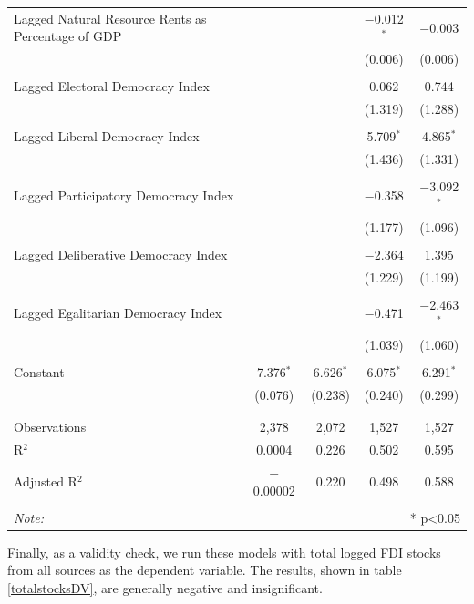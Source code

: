 \documentclass[11pt, titlepage]{article} %
\begin{document}
\begin{table}[!htbp]
\begin{tabular}{@{\extracolsep{5pt}}lcccc}
 Lagged Natural Resource Rents as Percentage of GDP &  &  & $-$0.012$^{*}$ & $-$0.003 \\ 
  &  &  & (0.006) & (0.006) \\ 
  & & & & \\ 
 Lagged Electoral Democracy Index &  &  & 0.062 & 0.744 \\ 
  &  &  & (1.319) & (1.288) \\ 
  & & & & \\ 
 Lagged Liberal Democracy Index &  &  & 5.709$^{*}$ & 4.865$^{*}$ \\ 
  &  &  & (1.436) & (1.331) \\ 
  & & & & \\ 
 Lagged Participatory Democracy Index &  &  & $-$0.358 & $-$3.092$^{*}$ \\ 
  &  &  & (1.177) & (1.096) \\ 
  & & & & \\ 
 Lagged Deliberative Democracy Index &  &  & $-$2.364 & 1.395 \\ 
  &  &  & (1.229) & (1.199) \\ 
  & & & & \\ 
 Lagged Egalitarian Democracy Index &  &  & $-$0.471 & $-$2.463$^{*}$ \\ 
  &  &  & (1.039) & (1.060) \\ 
  & & & & \\ 
 Constant & 7.376$^{*}$ & 6.626$^{*}$ & 6.075$^{*}$ & 6.291$^{*}$ \\ 
  & (0.076) & (0.238) & (0.240) & (0.299) \\ 
  & & & & \\ 
\hline \\[-1.8ex] 
Observations & 2,378 & 2,072 & 1,527 & 1,527 \\ 
R$^{2}$ & 0.0004 & 0.226 & 0.502 & 0.595 \\ 
Adjusted R$^{2}$ & $-$0.00002 & 0.220 & 0.498 & 0.588 \\ 
\hline 
\hline \\[-1.8ex] 
\textit{Note:}  & \multicolumn{4}{r}{* p<0.05} \\ 
\end{tabular} 
\end{table} 

Finally, as a validity check, we run these models with total logged FDI stocks from all sources as the dependent variable. The results, shown in table \ref{totalstocksDV}, are generally negative and insignificant.
\end{document}
